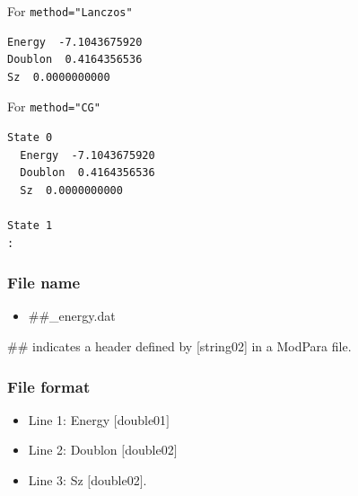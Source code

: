 For \verb|method="Lanczos"|

\begin{minipage}{12.5cm}
\begin{screen}
\begin{verbatim}
Energy  -7.1043675920 
Doublon  0.4164356536 
Sz  0.0000000000 
\end{verbatim}
\end{screen}
\end{minipage}

For \verb|method="CG"|

\begin{minipage}{12.5cm}
\begin{screen}
\begin{verbatim}
State 0
  Energy  -7.1043675920 
  Doublon  0.4164356536 
  Sz  0.0000000000 

State 1
:
\end{verbatim}
\end{screen}
\end{minipage}

\subsubsection{File name}
 \begin{itemize}
   \item  \#\#\_energy.dat
 \end{itemize}
 \#\# indicates a header defined by [string02] in a ModPara file.

\subsubsection{File format}
 \begin{itemize}
   \item Line 1: Energy $[$double01$]$
   \item Line 2: Doublon $[$double02$]$
   \item Line 3: Sz $[$double02$]$.
  \end{itemize}
